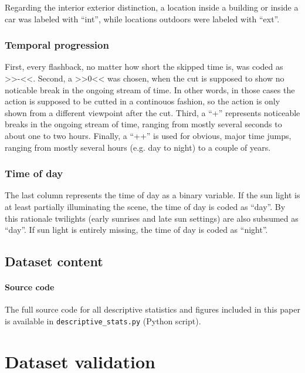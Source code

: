 \documentclass[10pt,a4paper,twocolumn]{article}
\begin{document}
Regarding the interior exterior distinction, a location inside a building
or inside a car was labeled with ``int'', while locations outdoors
were labeled with ``ext''. 


\subsubsection*{Temporal progression}

First, every flashback, no matter how short the skipped time is, was
coded as >>-<<. Second, a >>0<< was chosen, when the cut is supposed
to show no noticable break in the ongoing stream of time. In other
words, in those cases the action is supposed to be cutted in a continouos
fashion, so the action is only shown from a different viewpoint after
the cut. Third, a ``+'' represents noticeable breaks in the ongoing
stream of time, ranging from mostly several seconds to about one to
two hours. Finally, a ``++'' is used for obvious, major time jumps,
ranging from mostly several hours (e.g. day to night) to a couple
of years.


\subsubsection*{Time of day }

The last column represents the time of day as a binary variable. If
the sun light is at least partially illuminating the scene, the time
of day is coded as ``day''. By this rationale twilights (early sunrises
and late sun settings) are also subsumed as ``day''. If sun light
is entirely missing, the time of day is coded as ``night''. 



\subsection*{Dataset content}


\paragraph{Source code}

The full source code for all descriptive statistics and figures included in
this paper is available in \texttt{descriptive\_stats.py} (Python script).


\section*{Dataset validation}
\end{document}
